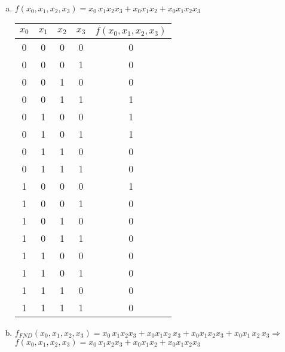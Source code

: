 {\begin{solution}
  \begin{enumerate}[a)]
  \item $f(x_0,x_1,x_2,x_3)=\!x_0\,\!x_1x_2x_3 + \!x_0x_1\!x_2 + x_0\!x_1\!x_2\!x_3$\\
    \begin{center}
      \begin{tabular}[ht]{cccc|c}
        $x_0$& $x_1$ & $x_2$ & $x_3$ & $f(x_0,x_1,x_2,x_3)$\\\hline
        0 & 0 & 0 & 0 & 0\\
        0 & 0 & 0 & 1 & 0\\
        0 & 0 & 1 & 0 & 0\\
        0 & 0 & 1 & 1 & 1\\
        0 & 1 & 0 & 0 & 1\\
        0 & 1 & 0 & 1 & 1\\
        0 & 1 & 1 & 0 & 0\\
        0 & 1 & 1 & 1 & 0\\
        1 & 0 & 0 & 0 & 1\\
        1 & 0 & 0 & 1 & 0\\
        1 & 0 & 1 & 0 & 0\\
        1 & 0 & 1 & 1 & 0\\
        1 & 1 & 0 & 0 & 0\\
        1 & 1 & 0 & 1 & 0\\
        1 & 1 & 1 & 0 & 0\\
        1 & 1 & 1 & 1 & 0\\
    \end{tabular}
  \end{center}
\item $f_{FND}(x_0,x_1,x_2,x_3)=\!x_0\,\!x_1x_2x_3 + \!x_0x_1\!x_2\,\!x_3 + 
  \!x_0x_1\!x_2x_3 + x_0\!x_1\,\!x_2\,\!x_3\Rightarrow$\\
  $f(x_0,x_1,x_2,x_3)=\!x_0\,\!x_1x_2x_3 + \!x_0x_1\!x_2 + x_0\!x_1\!x_2\!x_3$
\end{enumerate}
\end{solution}

}
